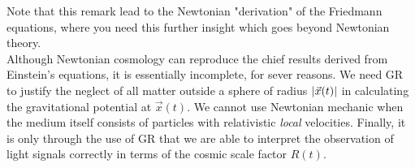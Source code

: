 Note that this remark lead to the Newtonian "derivation" of the Friedmann equations, where you need this further insight which goes beyond Newtonian theory.\\
Although Newtonian cosmology can reproduce the chief results derived from Einstein's equations, it is essentially incomplete, for sever reasons. We need GR to justify the neglect of all matter outside a sphere of radius $\abs{\vec{x}(t)}$ in calculating the gravitational potential at $\vec{x}(t)$. We cannot use Newtonian mechanic when the medium itself consists of particles with relativistic \emph{local} velocities. Finally, it is only through the use of GR that we are able to interpret the observation of light signals correctly in terms of the cosmic scale factor $R(t)$.











